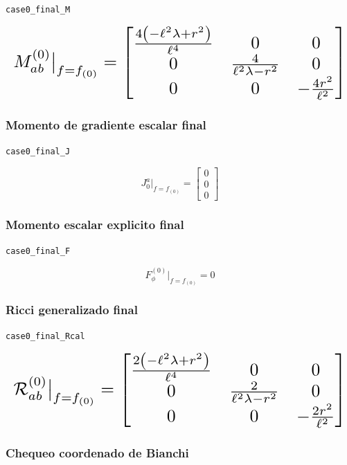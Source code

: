 \documentclass[11pt,a4paper]{article}
\begin{document}
\noindent\texttt{case0\_final\_M}\par\nopagebreak[4]

\[
\resizebox{\textwidth}{!}{$\displaystyle M^{(0)}_{ab}\big|_{f=f_{(0)}} = \left[\begin{matrix}\frac{4 \left(- \ell^{2} \lambda + r^{2}\right)}{\ell^{4}} & 0 & 0\\0 & \frac{4}{\ell^{2} \lambda - r^{2}} & 0\\0 & 0 & - \frac{4 r^{2}}{\ell^{2}}\end{matrix}\right]$}
\]

\subsubsection{Momento de gradiente escalar final}

\noindent\texttt{case0\_final\_J}\par\nopagebreak[4]

\[
J_0^a\big|_{f=f_{(0)}} = \left[\begin{matrix}0\\0\\0\end{matrix}\right]
\]

\subsubsection{Momento escalar explicito final}

\noindent\texttt{case0\_final\_F}\par\nopagebreak[4]

\[
F_\phi^{(0)}\big|_{f=f_{(0)}} = 0
\]

\subsubsection{Ricci generalizado final}

\noindent\texttt{case0\_final\_Rcal}\par\nopagebreak[4]

\[
\resizebox{\textwidth}{!}{$\displaystyle \mathcal R^{(0)}_{ab}\big|_{f=f_{(0)}} = \left[\begin{matrix}\frac{2 \left(- \ell^{2} \lambda + r^{2}\right)}{\ell^{4}} & 0 & 0\\0 & \frac{2}{\ell^{2} \lambda - r^{2}} & 0\\0 & 0 & - \frac{2 r^{2}}{\ell^{2}}\end{matrix}\right]$}
\]

\subsubsection{Chequeo coordenado de Bianchi}
\end{document}
